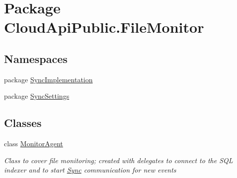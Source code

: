 \hypertarget{namespace_cloud_api_public_1_1_file_monitor}{\section{Package Cloud\-Api\-Public.\-File\-Monitor}
\label{namespace_cloud_api_public_1_1_file_monitor}
}
\subsection*{Namespaces}
\begin{DoxyCompactItemize}
\item 
package \hyperlink{namespace_cloud_api_public_1_1_file_monitor_1_1_sync_implementation}{Sync\-Implementation}
\item 
package \hyperlink{namespace_cloud_api_public_1_1_file_monitor_1_1_sync_settings}{Sync\-Settings}
\end{DoxyCompactItemize}
\subsection*{Classes}
\begin{DoxyCompactItemize}
\item 
class \hyperlink{class_cloud_api_public_1_1_file_monitor_1_1_monitor_agent}{Monitor\-Agent}
\begin{DoxyCompactList}\small\item\em Class to cover file monitoring; created with delegates to connect to the S\-Q\-L indexer and to start \hyperlink{namespace_cloud_api_public_1_1_sync}{Sync} communication for new events \end{DoxyCompactList}\end{DoxyCompactItemize}
